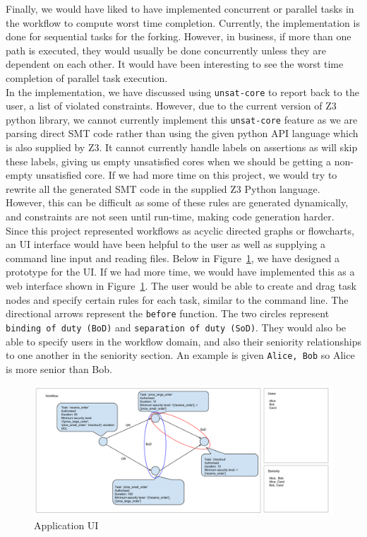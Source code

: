 \documentclass[a4paper]{report}
\begin{document}
Finally, we would have liked to have implemented concurrent or parallel tasks in the workflow to compute worst time completion. Currently, the implementation is done for sequential tasks for the forking. However, in business, if more than one path is executed, they would usually be done concurrently unless they are dependent on each other. It would have been interesting to see the worst time completion of parallel task execution. \\

In the implementation, we have discussed using \texttt{unsat-core} to report back to the user, a list of violated constraints. However, due to the current version of Z3 python library, we cannot currently implement this \texttt{unsat-core} feature as we are parsing direct SMT code rather than using the given python API language which is also supplied by Z3. It cannot currently handle labels on assertions as will skip these labels, giving us empty unsatisfied cores when we should be getting a non-empty unsatisfied core. If we had more time on this project, we would try to rewrite all the generated SMT code in the supplied Z3 Python language. However, this can be difficult as some of these rules are generated dynamically, and constraints are not seen until run-time, making code generation harder. \\

Since this project represented workflows as acyclic directed graphs or flowcharts, an UI interface would have been helpful to the user as well as supplying a command line input and reading files. Below in Figure~\ref{fig:Application UI}, we have designed a prototype for the UI. If we had more time, we would have implemented this as a web interface shown in Figure~\ref{fig:Application UI}. The user would be able to create and drag task nodes and specify certain rules for each task, similar to the command line. The directional arrows represent the \texttt{before} function. The two circles represent \texttt{binding of duty (BoD)} and \texttt{separation of duty (SoD)}. They would also be able to specify users in the workflow domain, and also their seniority relationships to one another in the seniority section. An example is given \texttt{Alice, Bob} so Alice is more senior than Bob.

\begin{figure}
\includegraphics[scale=0.35, angle=90,origin=c]{ui.png}
\caption{Application UI}
\label{fig:Application UI}
\end{figure}
\end{document}
